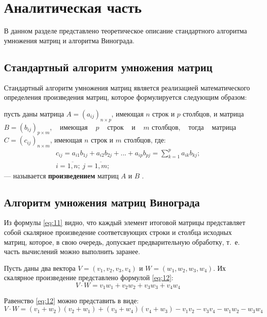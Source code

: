 \chapter{Аналитическая часть}

В данном разделе представлено теоретическое описание стандартного алгоритма
умножения матриц и алгоритма Винограда.

\section{Стандартный алгоритм умножения матриц}

Стандартный алгоритм умножения матриц является реализацией математического
определения произведения матриц, которое формулируется следующим образом:

    пусть даны матрица $A = (a_{ij})_{n \times p}$, имеющая $n$ строк и $p$
столбцов, и матрица ~$B = (b_{ij})_{p \times m}$, ~ имеющая ~ $p$ ~ строк ~ и ~
$m$ столбцов, ~ тогда ~ матрица ${C=(c_{ij})_{n \times m}}$, имеющая $n$
строк и $m$ столбцов, где:
\begin{equation}\label{eq:11}
    \begin{gathered}
        c_{ij}=a_{i1}b_{1j}+a_{i2}b_{2j} +...+a_{ip}b_{pj}=\sum\limits_{k=1}^p
        a_{ik}b_{kj};\\
        i = \overline{1,n};~j = \overline{1,m};
    \end{gathered}
\end{equation}
--- называется \textbf{произведением} матриц $A$ и $B$ \cite{math}.

\section{Алгоритм умножения матриц Винограда}

Из формулы \ref{eq:11} видно, что каждый элемент итоговой матрицы представляет
собой скалярное произведение соответсвующих строки и столбца исходных матриц,
которое, в свою очередь, допускает предварительную обработку, т.~е. часть
вычислений можно выполнить заранее.

Пусть даны два вектора $V=(v_1, v_2, v_3, v_4)$ и
$W=(w_1,w_2,w_3,w_4)$. Их скалярное произведение
представлено формулой \ref{eq:12}:
\begin{equation}\label{eq:12}
    V \cdot W = v_1w_1+v_2w_2+v_3w_3+v_4w_4
\end{equation}

Равенство \ref{eq:12} можно представить в виде:
\begin{equation}\label{eq:13}
    V \cdot W = (v_1+w_2)(v_2+w_1)+(v_3+w_4)(v_4+w_3)-v_1v_2-v_3v_4-w_1w_2-w_3w_4
\end{equation}

